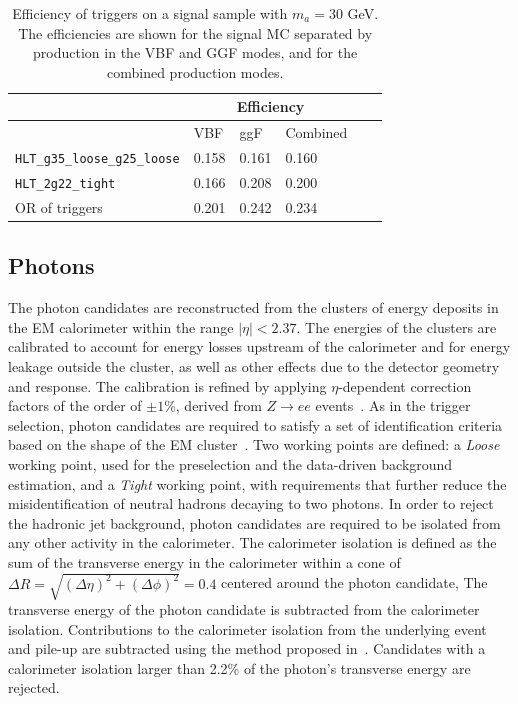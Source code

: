 \begin{table}[]
\centering
  \caption{Efficiency of triggers on a signal sample with $m_a=30$ GeV. The efficiencies are shown for the signal MC separated by production in the VBF and GGF modes, and for the combined production modes.}
\label{tab:HBSM:trigeff}
\begin{tabular}{|l|l|l|l|l|l|}
\hline
                                                      & \multicolumn{3}{c|}{Efficiency}  \\ \hline
                                                      & VBF      & ggF  & Combined   \\ \hline
\texttt{HLT\_g35\_loose\_g25\_loose}                  & 0.158  & 0.161 & 0.160\\ \hline
\texttt{HLT\_2g22\_tight}                             & 0.166  & 0.208 & 0.200\\ \hline
OR of triggers                                        & 0.201  & 0.242 & 0.234\\ \hline
\end{tabular}
\end{table}

\subsection{Photons}
\label{sec:HBSM:photons}
The photon candidates are reconstructed from the clusters of energy deposits in the EM calorimeter within the range $|\eta|<2.37$.
The energies of the clusters are calibrated to account for energy losses upstream of the calorimeter and for energy leakage outside the cluster, as well as other effects due to the detector geometry and response.
The calibration is refined by applying $\eta$-dependent correction factors of the order of $\pm1$\%, derived from $Z\to ee$ events~\cite{PERF-2013-05}.
As in the trigger selection, photon candidates are required to satisfy a set of identification criteria based on the shape of the EM cluster~\cite{PERF-2013-04}.
Two working points are defined: a \textit{Loose} working point, used for the preselection and the data-driven background estimation, and a 
\textit{Tight} working point, with requirements that further reduce the misidentification of neutral hadrons decaying to two photons.
In order to reject the hadronic jet background, photon candidates are required to be isolated from any other activity in the calorimeter.
The calorimeter isolation is defined as the sum of the transverse energy in the
calorimeter within a cone of \mbox{$\Delta R = \sqrt{(\Delta\eta)^2+(\Delta\phi)^2}=0.4$} centered around the photon candidate,
The transverse energy of the photon candidate is subtracted from the calorimeter isolation.
Contributions to the calorimeter isolation from the underlying event and pile-up are subtracted using the method proposed in~\cite{Cacciari:2007fd}.
Candidates with a calorimeter isolation larger than 2.2\% of the photon's transverse energy are rejected.

